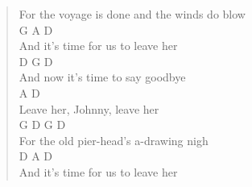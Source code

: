 \documentclass[11pt]{article}
\begin{document}
\begin{verse}
For the voyage is done and the winds do blow\\
\hspace*{9em}G        A     D\\
And it's time for us to leave her\\
\vspace*{1em}
\vspace*{1em}
D                     G       D\\
And now it's time to say goodbye\\
A                  D\\
Leave her, Johnny, leave her\\
\hspace*{9em}G        D       G         D\\
For the old pier-head's a-drawing nigh\\
\hspace*{9em}D        A     D\\
And it's time for us to leave her\\
\end{verse}
\clearpage
\end{document}

